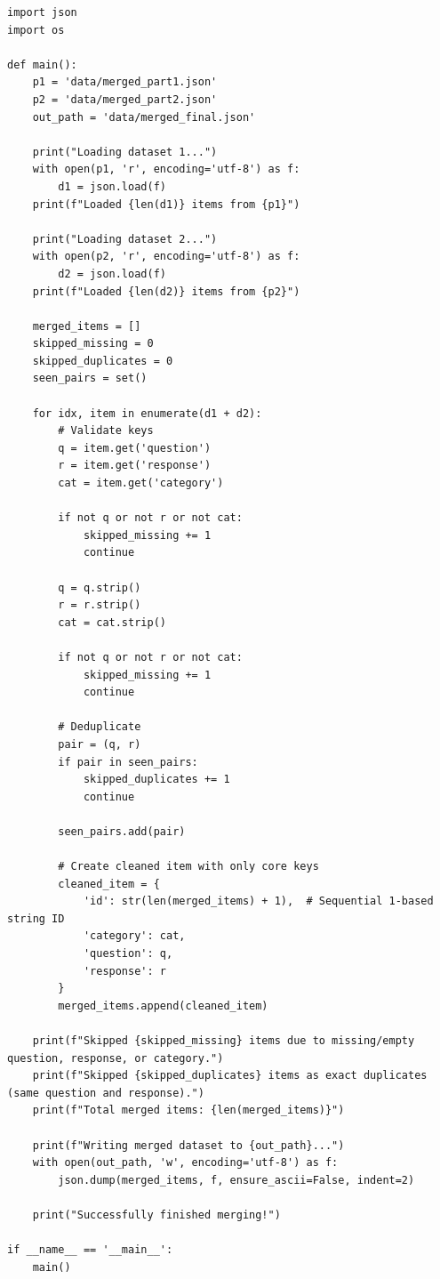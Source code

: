 \documentclass[11pt]{article}
\begin{document}
\begin{lstlisting}[style=pythoncode, caption={dataset\_merger.py}]
import json
import os

def main():
    p1 = 'data/merged_part1.json'
    p2 = 'data/merged_part2.json'
    out_path = 'data/merged_final.json'

    print("Loading dataset 1...")
    with open(p1, 'r', encoding='utf-8') as f:
        d1 = json.load(f)
    print(f"Loaded {len(d1)} items from {p1}")

    print("Loading dataset 2...")
    with open(p2, 'r', encoding='utf-8') as f:
        d2 = json.load(f)
    print(f"Loaded {len(d2)} items from {p2}")

    merged_items = []
    skipped_missing = 0
    skipped_duplicates = 0
    seen_pairs = set()

    for idx, item in enumerate(d1 + d2):
        # Validate keys
        q = item.get('question')
        r = item.get('response')
        cat = item.get('category')

        if not q or not r or not cat:
            skipped_missing += 1
            continue

        q = q.strip()
        r = r.strip()
        cat = cat.strip()

        if not q or not r or not cat:
            skipped_missing += 1
            continue

        # Deduplicate
        pair = (q, r)
        if pair in seen_pairs:
            skipped_duplicates += 1
            continue

        seen_pairs.add(pair)

        # Create cleaned item with only core keys
        cleaned_item = {
            'id': str(len(merged_items) + 1),  # Sequential 1-based string ID
            'category': cat,
            'question': q,
            'response': r
        }
        merged_items.append(cleaned_item)

    print(f"Skipped {skipped_missing} items due to missing/empty question, response, or category.")
    print(f"Skipped {skipped_duplicates} items as exact duplicates (same question and response).")
    print(f"Total merged items: {len(merged_items)}")

    print(f"Writing merged dataset to {out_path}...")
    with open(out_path, 'w', encoding='utf-8') as f:
        json.dump(merged_items, f, ensure_ascii=False, indent=2)

    print("Successfully finished merging!")

if __name__ == '__main__':
    main()
\end{lstlisting}
\end{document}

